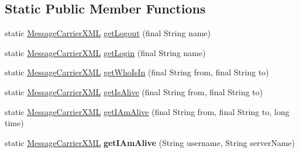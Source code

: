 \subsection*{Static Public Member Functions}
\begin{DoxyCompactItemize}
\item 
static \hyperlink{classgov_1_1fnal_1_1ppd_1_1dd_1_1xml_1_1MessageCarrierXML}{Message\-Carrier\-X\-M\-L} \hyperlink{classgov_1_1fnal_1_1ppd_1_1dd_1_1xml_1_1MessageCarrierXML_ab474605f73570d51cb1e55473aa113ab}{get\-Logout} (final String name)
\item 
static \hyperlink{classgov_1_1fnal_1_1ppd_1_1dd_1_1xml_1_1MessageCarrierXML}{Message\-Carrier\-X\-M\-L} \hyperlink{classgov_1_1fnal_1_1ppd_1_1dd_1_1xml_1_1MessageCarrierXML_aa643242a15c157032471317eb103f2a0}{get\-Login} (final String name)
\item 
static \hyperlink{classgov_1_1fnal_1_1ppd_1_1dd_1_1xml_1_1MessageCarrierXML}{Message\-Carrier\-X\-M\-L} \hyperlink{classgov_1_1fnal_1_1ppd_1_1dd_1_1xml_1_1MessageCarrierXML_aeed287b861456e86a0359707501ee2a8}{get\-Who\-Is\-In} (final String from, final String to)
\item 
static \hyperlink{classgov_1_1fnal_1_1ppd_1_1dd_1_1xml_1_1MessageCarrierXML}{Message\-Carrier\-X\-M\-L} \hyperlink{classgov_1_1fnal_1_1ppd_1_1dd_1_1xml_1_1MessageCarrierXML_aae99eb89f6a79d7f2d12e7b38c07c17d}{get\-Is\-Alive} (final String from, final String to)
\item 
static \hyperlink{classgov_1_1fnal_1_1ppd_1_1dd_1_1xml_1_1MessageCarrierXML}{Message\-Carrier\-X\-M\-L} \hyperlink{classgov_1_1fnal_1_1ppd_1_1dd_1_1xml_1_1MessageCarrierXML_a905ca8052d9b8bb961c6e267c1e0b862}{get\-I\-Am\-Alive} (final String from, final String to, long time)
\item 
\hypertarget{classgov_1_1fnal_1_1ppd_1_1dd_1_1xml_1_1MessageCarrierXML_a85eb6e5baf2dcc62028b6eadb08715d1}{static \hyperlink{classgov_1_1fnal_1_1ppd_1_1dd_1_1xml_1_1MessageCarrierXML}{Message\-Carrier\-X\-M\-L} {\bfseries get\-I\-Am\-Alive} (String username, String server\-Name)}\label{classgov_1_1fnal_1_1ppd_1_1dd_1_1xml_1_1MessageCarrierXML_a85eb6e5baf2dcc62028b6eadb08715d1}


\end{DoxyCompactItemize}
